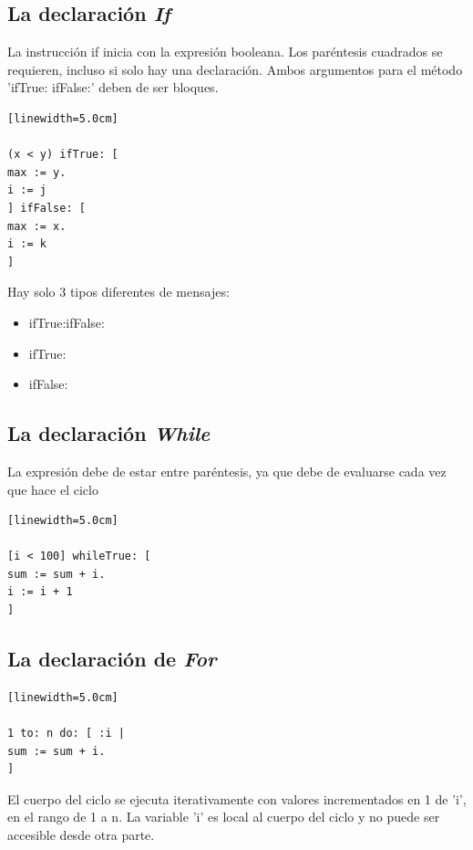 \documentclass[10pt,journal,compsoc]{IEEEtran}
\begin{document}
\subsection{La declaraci\'on \emph{If}}
La instrucci\'on if inicia con la expresi\'on booleana. Los par\'entesis cuadrados se requieren, incluso si solo hay una declaraci\'on. Ambos argumentos para el m\'etodo 'ifTrue: ifFalse:' deben de ser bloques.

\begin{lstlisting}[language=Smalltalk, caption = {Sintaxis de un If}][linewidth=5.0cm]

(x < y) ifTrue: [
max := y.
i := j
] ifFalse: [
max := x.
i := k
]

\end{lstlisting}
Hay solo 3 tipos diferentes de mensajes:
\begin{itemize}
	\item ifTrue:ifFalse:
	\item ifTrue:
	\item ifFalse:
\end{itemize}

\subsection{La declaraci\'on \emph{While}}
La expresi\'on debe de estar entre par\'entesis, ya que debe de evaluarse cada vez que hace el ciclo 
\begin{lstlisting}[language=Smalltalk, caption = {Ejemplo de un ciclo "while".}][linewidth=5.0cm]

[i < 100] whileTrue: [
sum := sum + i.
i := i + 1
]

\end{lstlisting}

\subsection{La declaraci\'on de \emph{For}}

\begin{lstlisting}[language=Smalltalk, caption = {Ejemplo de un ciclo "for".}][linewidth=5.0cm]

1 to: n do: [ :i |
sum := sum + i.
] 

\end{lstlisting}
El cuerpo del ciclo se ejecuta iterativamente con valores incrementados en 1 de 'i', en el rango de 1 a n. La variable 'i' es local al cuerpo del ciclo y no puede ser accesible desde otra parte.
\end{document}
